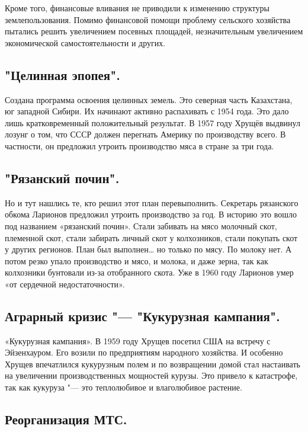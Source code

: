 Кроме того, финансовые вливания не приводили к изменению структуры землепользования. Помимо финансовой помощи проблему сельского хозяйства пытались решить увеличением посевных площадей, незначительным увеличением экономической самостоятельности и других. 

\subsection{"Целинная эпопея".}

Создана программа освоения целинных земель. Это северная часть Казахстана, юг западной Сибири. Их начинают активно распахивать с 1954 года. Это дало лишь кратковременный положительный результат. В 1957 году Хрущёв выдвинул лозунг о том, что СССР должен перегнать Америку по производству всего. В частности, он предложил утроить производство мяса в стране за три года. 

\subsection{"Рязанский почин".}

Но и тут нашлись те, кто решил этот план перевыполнить. Секретарь рязанского обкома Ларионов предложил утроить производство за год. В историю это вошло под названием «рязанский почин». Стали забивать на мясо молочный скот, племенной скот, стали забирать личный скот у колхозников, стали покупать скот у других регионов. План был выполнен… но только по мясу. По молоку нет. А потом резко упало производство и мясо, и молока, и даже зерна, так как колхозники бунтовали из-за отобранного скота. Уже в 1960 году Ларионов умер «от сердечной недостаточности».

\subsection{Аграрный кризис "--- "Кукурузная кампания".}

«Кукурузная кампания». В 1959 году Хрущев посетил США на встречу с Эйзенхауром. Его возили по предприятиям народного хозяйства. И особенно Хрущев впечатлился кукурузным полем и по возвращении домой стал настаивать на увеличении производственных мощностей курузы. Это привело к катастрофе, так как кукуруза "--- это теплолюбивое и влаголюбивое растение.

\subsection{Реорганизация МТС.}

